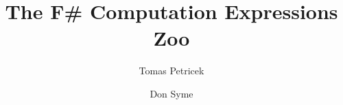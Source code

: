 \documentclass[runningheads,a4paper]{llncs}
\begin{document}
\title{The F\# Computation Expressions Zoo}
\author{Tomas Petricek \and Don Syme}


\maketitle


\newcommand{\sep}[0]{\; | \;}
\newcommand{\kvd}[1]{\textnormal{\bfseries\sffamily #1}}
\newcommand{\plc}[1]{\textnormal{\emph{#1}}}
\newcommand{\ident}[1]{\textnormal{\sffamily #1}}

\newcommand{\cexpr}{\plc{cexpr}}
\newcommand{\expr}{\plc{expr}}
\newcommand{\binds}{\plc{binds}}
\newcommand{\pat}{\plc{pat}}

\newcommand{\mtyp}[1]{M #1}
\newcommand{\ntyp}[1]{N #1}
\newcommand{\ltyp}[1]{L #1}
\newcommand{\dtyp}[1]{D #1}

\newcommand{\tya}[2]{#1\hspace{-0.15em}:\hspace{-0.15em}#2}
\newcommand{\cvdash}{\Vdash_\sigma}
\newcommand{\bvdash}{\vartriangleright_\sigma}
\newcommand{\unit}{\ident{unit}}

\newcommand{\tsl}[1]{|[ \,#1\, |]_m}
\newcommand{\tsb}[1]{\langle\hspace{-0.25em}\langle #1 \rangle\hspace{-0.25em}\rangle_m}
\newcommand{\tsv}[1]{\langle #1 \rangle}

\end{document}
